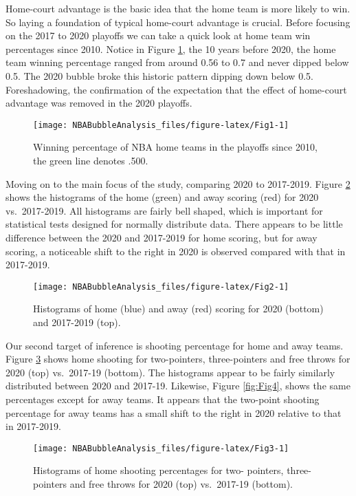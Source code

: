\documentclass[12pt, letterpaper, titlepage]{article}
\begin{document}
Home-court advantage is the basic idea that the home team is more likely to win.
So laying a foundation of typical home-court advantage is crucial. Before
focusing on the 2017 to 2020 playoffs we can take a quick look at home team win
percentages since 2010. Notice in Figure \ref{fig:Fig1}, the 10 years before 2020, the home team
winning percentage ranged from around 0.56 to 0.7 and never dipped below 0.5. The
2020 bubble broke this historic pattern dipping down below 0.5. Foreshadowing,
the confirmation of the expectation that the effect of home-court advantage was removed
in the 2020 playoffs.

\begin{figure}
  \centering
  \texttt{[image: NBABubbleAnalysis\_files/figure-latex/Fig1-1]}
  \caption{Winning percentage of NBA home teams in the playoffs since
    2010, the green line denotes .500.}
  \label{fig:Fig1}
\end{figure}

Moving on to the main focus of the study, comparing 2020 to 2017-2019.
Figure \ref{fig:Fig2} shows the histograms of the home (green) and
away scoring (red) for 2020 vs.~2017-2019. All histograms are
fairly bell shaped, which is important for statistical tests
designed for normally distribute data. There appears to be little
difference between the 2020 and 2017-2019 for home scoring, but for
away scoring, a noticeable shift to the right in 2020 is observed
compared with that in 2017-2019.




\begin{figure}
  \centering
  \texttt{[image: NBABubbleAnalysis\_files/figure-latex/Fig2-1]}
  \caption{Histograms of home (blue) and away (red) scoring
    for 2020 (bottom) and 2017-2019 (top).}
  \label{fig:Fig2}
\end{figure}

Our second target of inference is shooting percentage for home and away teams.
Figure \ref{fig:Fig3} shows home shooting for two-pointers, three-pointers and
free throws for 2020 (top) vs.~2017-19 (bottom). The histograms appear to be fairly
similarly distributed between 2020 and 2017-19. Likewise, Figure \ref{fig:Fig4},
shows the same percentages except for away teams. It appears that the
two-point shooting percentage for away teams has a small shift to the
right in 2020 relative to that in 2017-2019.




\begin{figure}
  \centering
  \texttt{[image: NBABubbleAnalysis\_files/figure-latex/Fig3-1]}
  \caption{Histograms of home shooting percentages for two-
    pointers, three-pointers and free throws for 2020 (top) vs.~2017-19
    (bottom).}
  \label{fig:Fig3}
\end{figure}
\end{document}
